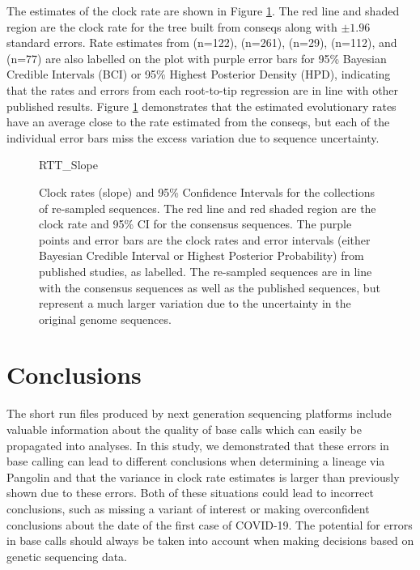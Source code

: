\documentclass[10pt]{article}
\begin{document}
The estimates of the clock rate are shown in Figure \ref{fig:RTT_slope}. The red line and shaded region are the clock rate for the tree built from conseqs along with $\pm 1.96$ standard errors. Rate estimates from \citet{ducheneTemporalSignalPhylodynamic2020} (n=122), \citet{choudharySevereAcuteRespiratory2021} (n=261), \citet{songGenomicEpidemiologySARSCoV22021} (n=29), \citet{niePhylogeneticPhylodynamicAnalyses2020} (n=112), and \citet{geidelbergGenomicEpidemiologyDensely2021} (n=77) are also labelled on the plot with purple error bars for 95\% Bayesian Credible Intervals (BCI) or 95\% Highest Posterior Density (HPD), indicating that the rates and errors from each root-to-tip regression are in line with other published results.
Figure \ref{fig:RTT_slope} demonstrates that the estimated evolutionary rates have an average close to the rate estimated from the conseqs, but each of the individual error bars miss the excess variation due to sequence uncertainty.


\begin{figure}
RTT\_Slope
\caption{\label{fig:RTT_slope}Clock rates (slope) and 95\% Confidence Intervals for the collections of re-sampled sequences. The red line and red shaded region are the clock rate and 95\% CI for the consensus sequences. The purple points and error bars are the clock rates and error intervals (either Bayesian Credible Interval or Highest Posterior Probability) from published studies, as labelled. The re-sampled sequences are in line with the consensus sequences as well as the published sequences, but represent a much larger variation due to the uncertainty in the original genome sequences.}
\end{figure}


\section{Conclusions}

The short run files produced by next generation sequencing platforms include valuable information about the quality of base calls which can easily be propagated into analyses.
In this study, we demonstrated that these errors in base calling can lead to different conclusions when determining a lineage via Pangolin and that the variance in clock rate estimates is larger than previously shown due to these errors.
Both of these situations could lead to incorrect conclusions, such as missing a variant of interest or making overconfident conclusions about the date of the first case of COVID-19.
The potential for errors in base calls should always be taken into account when making decisions based on genetic sequencing data.
\end{document}
